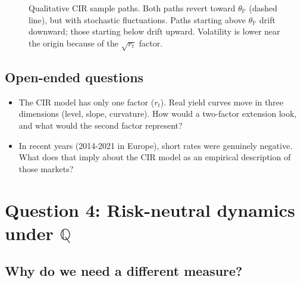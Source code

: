 \documentclass[11pt]{article}
\newcommand{\PP}{\mathbb{P}}
\newcommand{\QQ}{\mathbb{Q}}
\begin{document}
\begin{figure}[ht]
\centering
{}
\caption{Qualitative CIR sample paths.  Both paths revert toward $\theta_\PP$
(dashed line), but with stochastic fluctuations.  Paths starting above
$\theta_\PP$ drift downward; those starting below drift upward.  Volatility
is lower near the origin because of the $\sqrt{r_t}$ factor.}
\end{figure}

\subsection*{Open-ended questions}
\begin{itemize}
  \item The CIR model has only one factor ($r_t$).  Real yield curves move
  in three dimensions (level, slope, curvature).  How would a
  two-factor extension look, and what would the second factor represent?
  \item In recent years (2014-2021 in Europe), short rates were genuinely
  negative.  What does that imply about the CIR model as an empirical
  description of those markets?
\end{itemize}

\newpage
\section{Question 4: Risk-neutral dynamics under $\QQ$}

\subsection{Why do we need a different measure?}
\end{document}
